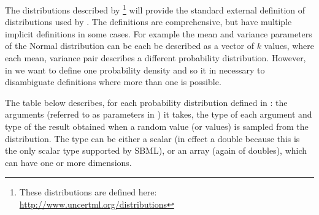 \documentclass[draftspec]{sbmlpkgspec}
\begin{document}
The distributions described by \uncertml \uncertml \footnote{These
  distributions are defined here:
  \url{http://www.uncertml.org/distributions}} will provide the
standard external definition of distributions used by \distrib. The
definitions are comprehensive, but have multiple implicit definitions
in some cases. For example the mean and variance parameters of the
Normal distribution can be each be described as a vector of $k$
values, where each mean, variance pair describes a different
probability distribution. However, in \distribshort we want to define
one probability density and so it in necessary to disambiguate
definitions where more than one is possible.

The table below describes, for each probability distribution defined in
\uncertml: the arguments (referred to as parameters in \uncertml) it
takes, the type of each argument and type of the result obtained when
a random value (or values) is sampled from the distribution. The type
can be either a scalar (in effect a double because this is the only
scalar type supported by SBML), or an array (again of doubles), which
can have one or more dimensions.
\end{document}
